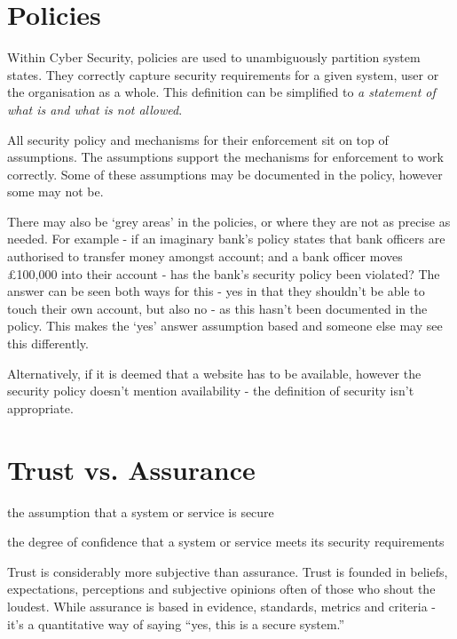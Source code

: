 
\section{Policies}
Within Cyber Security, policies are used to unambiguously partition system states. They correctly capture security requirements for a given system, user or the organisation as a whole. This definition can be simplified to \textit{a statement of what is and what is not allowed}. 

All security policy and mechanisms for their enforcement sit on top of assumptions. The assumptions support the mechanisms for enforcement to work correctly. Some of these assumptions may be documented in the policy, however some may not be. 

There may also be `grey areas' in the policies, or where they are not as precise as needed. For example - if an imaginary bank's policy states that bank officers are authorised to transfer money amongst account; and a bank officer moves £100,000 into their account - has the bank's security policy been violated? The answer can be seen both ways for this - yes in that they shouldn't be able to touch their own account, but also no - as this hasn't been documented in the policy. This makes the `yes' answer assumption based and someone else may see this differently.

Alternatively, if it is deemed that a website has to be available, however the security policy doesn't mention availability - the definition of security isn't appropriate. 

\section{Trust vs. Assurance}
\begin{define}
\item[Trust] the assumption that a system or service is secure
\item[Assurance] the degree of confidence that a system or service meets its security requirements
\end{define}

Trust is considerably more subjective than assurance. Trust is founded in beliefs, expectations, perceptions and subjective opinions often of those who shout the loudest. While assurance is based in evidence, standards, metrics and criteria - it's a quantitative way of saying ``yes, this is a secure system.''

